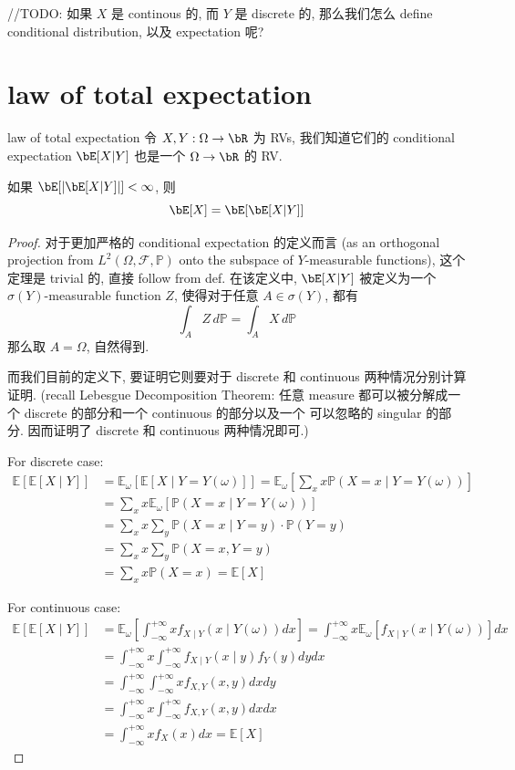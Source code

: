 //TODO: 如果 \(X\) 是 continous 的, 而 \(Y\) 是 discrete 的,
那么我们怎么 define conditional distribution, 以及 expectation 呢?








\section{law of total expectation}
\begin{theorem}{law of total expectation}
    令 \(X, Y: \Omega \to \bR \) 为 RVs, 我们知道它们的 conditional expectation \(\bE[X|Y]\) 也是一个 \(\Omega \to \bR\) 的 RV.

    如果 \(\bE[|\bE[X|Y]|] < \infty\), 则
    \[
    \bE[X] = \bE[\bE[X|Y]]
    \]
\end{theorem}
\begin{proof}
对于更加严格的 conditional expectation 的定义而言
 (as an orthogonal projection from \(L^2(\Omega, \mathcal{F}, \mathbb{P})\) 
 onto the subspace of \(Y\)-measurable functions), 这个定理是 trivial 的, 直接 follow from def. 
在该定义中, \(\bE[X|Y]\) 被定义为一个 \(\sigma(Y)\)-measurable function \(Z\), 
使得对于任意 \(A \in \sigma(Y)\), 都有 \[
\int_A Z \, d\mathbb{P} = \int_A X \, d\mathbb{P}
\]
那么取 \(A = \Omega\), 自然得到.

而我们目前的定义下, 要证明它则要对于 discrete 和 continuous 两种情况分别计算证明.
(recall Lebesgue Decomposition Theorem: 
任意 measure 都可以被分解成一个 discrete 的部分和一个 continuous 的部分以及一个
可以忽略的 singular 的部分. 因而证明了 discrete 和 continuous 两种情况即可.)

For discrete case:
\begin{align*}
\mathbb{E}[\mathbb{E}[X \mid Y]] & =\mathbb{E}_\omega[\mathbb{E}[X \mid Y=Y(\omega)]]=\mathbb{E}_\omega\left[\sum_x x \mathbb{P}(X=x \mid Y=Y(\omega))\right] \\
& =\sum_x x \mathbb{E}_\omega[\mathbb{P}(X=x \mid Y=Y(\omega))] \\
& =\sum_x x \sum_y \mathbb{P}(X=x \mid Y=y) \cdot \mathbb{P}(Y=y) \\
& =\sum_x x \sum_y \mathbb{P}(X=x, Y=y) \\
& =\sum_x x \mathbb{P}(X=x)=\mathbb{E}[X]
\end{align*}

For continuous case:
\begin{align*}
\mathbb{E}[\mathbb{E}[X \mid Y]] & =\mathbb{E}_\omega\left[\int_{-\infty}^{+\infty} x f_{X \mid Y}(x \mid Y(\omega)) d x\right]=\int_{-\infty}^{+\infty} x \mathbb{E}_\omega\left[f_{X \mid Y}(x \mid Y(\omega))\right] d x \\
& =\int_{-\infty}^{+\infty} x \int_{-\infty}^{+\infty} f_{X \mid Y}(x \mid y) f_Y(y) d y d x \\
& =\int_{-\infty}^{+\infty} \int_{-\infty}^{+\infty} x f_{X, Y}(x, y) d x d y \\
& =\int_{-\infty}^{+\infty} x \int_{-\infty}^{+\infty} f_{X, Y}(x, y) d x d x \\
& =\int_{-\infty}^{+\infty} x f_X(x) d x=\mathbb{E}[X]
\end{align*}
\end{proof}



